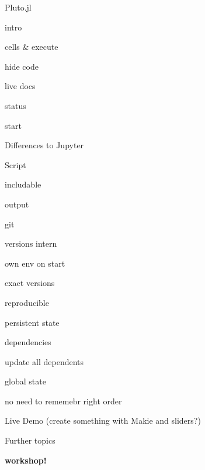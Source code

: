 \documentclass[a5paper,12pt,DIV=14,footheight=-30pt, headheight=60pt, twoside=off]{scrartcl}
\newenvironment{sublist}[1][]{%
  \color{juliapurple}%
  \quad\begin{enumerate*}[#1]%
}%
{\end{enumerate*}}
\begin{document}
\begin{enumerate}[resume]
    \item Pluto.jl
    \begin{sublist}
        \item intro
        \item cells \& execute
        \item hide code
        \item live docs
        \item status
        \item start
    \end{sublist}
    \item Differences to Jupyter
    \begin{sublist}
        \item Script
        \item includable
        \item output
        \item git
        \item versions intern
        \item own env on start
        \item exact versions
        \item reproducible
        \item persistent state
        \item dependencies
        \item update all dependents
        \item global state
        \item no need to rememebr right order
    \end{sublist}
    \item Live Demo (create something with Makie and sliders?)
    \item Further topics
\end{enumerate}
\textbf{workshop!}
\end{document}
